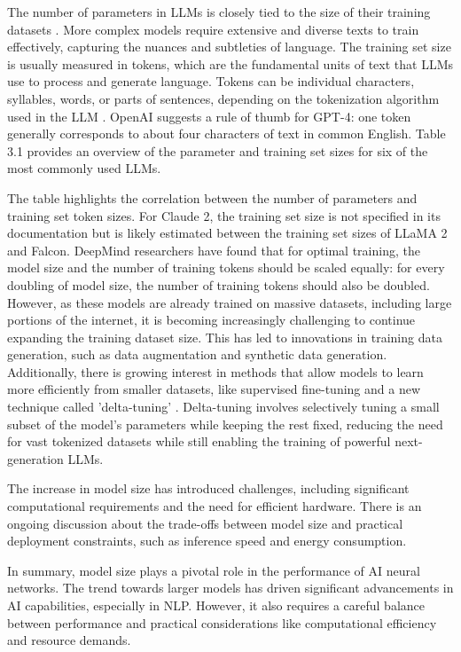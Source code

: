 The number of parameters in LLMs is closely tied to the size of their training datasets \cite{gpt3report}. More complex models require extensive and diverse texts to train effectively, capturing the nuances and subtleties of language. The training set size is usually measured in tokens, which are the fundamental units of text that LLMs use to process and generate language. Tokens can be individual characters, syllables, words, or parts of sentences, depending on the tokenization algorithm used in the LLM \cite{gpt3report}. OpenAI suggests a rule of thumb for GPT-4: one token generally corresponds to about four characters of text in common English. Table 3.1 provides an overview of the parameter and training set sizes for six of the most commonly used LLMs.

The table highlights the correlation between the number of parameters and training set token sizes. For Claude 2, the training set size is not specified in its documentation but is likely estimated between the training set sizes of LLaMA 2 and Falcon. DeepMind researchers \cite{deepmind2023} have found that for optimal training, the model size and the number of training tokens should be scaled equally: for every doubling of model size, the number of training tokens should also be doubled. However, as these models are already trained on massive datasets, including large portions of the internet, it is becoming increasingly challenging to continue expanding the training dataset size. This has led to innovations in training data generation, such as data augmentation and synthetic data generation. Additionally, there is growing interest in methods that allow models to learn more efficiently from smaller datasets, like supervised fine-tuning and a new technique called 'delta-tuning' \cite{deltatuning2023}. Delta-tuning involves selectively tuning a small subset of the model's parameters while keeping the rest fixed, reducing the need for vast tokenized datasets while still enabling the training of powerful next-generation LLMs.

The increase in model size has introduced challenges, including significant computational requirements and the need for efficient hardware. There is an ongoing discussion about the trade-offs between model size and practical deployment constraints, such as inference speed and energy consumption.

In summary, model size plays a pivotal role in the performance of AI neural networks. The trend towards larger models has driven significant advancements in AI capabilities, especially in NLP. However, it also requires a careful balance between performance and practical considerations like computational efficiency and resource demands.

